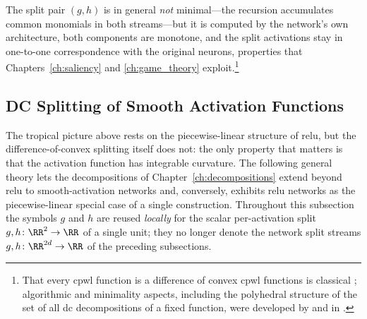 The split pair $(g, h)$ is in general \emph{not} minimal---the recursion accumulates common monomials in both streams---but it is computed by the network's own architecture, both components are monotone, and the split activations stay in one-to-one correspondence with the original neurons, properties that Chapters~\ref{ch:saliency} and \ref{ch:game_theory} exploit.\footnote{That every \ac{cpwl} function is a difference of convex \ac{cpwl} functions is classical \cite{Melzer1986_PLasDC,Kripfganz1987_PWAasDC,Zalgaller2000_DCRepresentation}; algorithmic and minimality aspects, including the polyhedral structure of the set of all \ac{dc} decompositions of a fixed function, were developed by \textcite{Griewank2020_PolyhedralDCDecomposition} and in \cite{Brandenburg2025_DecompositionPolyhedra,Koutschan2024_MinimalArity}.}

\subsection{DC Splitting of Smooth Activation Functions}\label{sec:dc_splitting_smooth}

The tropical picture above rests on the piecewise-linear structure of \ac{relu}, but the difference-of-convex splitting itself does not: the only property that matters is that the activation function has integrable curvature. The following general theory lets the decompositions of Chapter~\ref{ch:decompositions} extend beyond \ac{relu} to smooth-activation networks and, conversely, exhibits \ac{relu} networks as the piecewise-linear special case of a single construction. Throughout this subsection the symbols $g$ and $h$ are reused \emph{locally} for the scalar per-activation split $g, h \colon \RR^2 \to \RR$ of a single unit; they no longer denote the network split streams $g, h \colon \RR^{2d} \to \RR$ of the preceding subsections.

